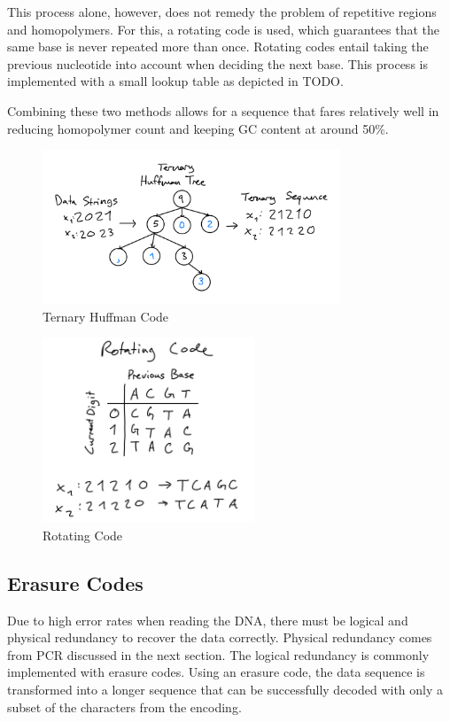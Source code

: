 \documentclass[a4paper,conference]{IEEEtran}
\begin{document}
This process alone, however, does not remedy the problem of repetitive regions and homopolymers. For this, a rotating code is used, which guarantees that the same base is never repeated more than once. Rotating codes entail taking the previous nucleotide into account when deciding the next base. This process is implemented with a small lookup table as depicted in TODO.

Combining these two methods allows for a sequence that fares relatively well in reducing homopolymer count and keeping GC content at around 50\%.



\begin{figure}
\centering
\includegraphics[width=3.5in]{huffman}
\caption{Ternary Huffman Code}
\label{code}
\end{figure}
\begin{figure}
\centering
\includegraphics[width=2.5in]{rotatingcode}
\caption{Rotating Code}
\label{code}
\end{figure}

\subsection{Erasure Codes}
Due to high error rates when reading the DNA, there must be logical and physical redundancy to recover the data correctly. Physical redundancy comes from PCR discussed in the next section. The logical redundancy is commonly \cite{} implemented with erasure codes. Using an erasure code, the data sequence is transformed into a longer sequence that can be successfully decoded with only a subset of the characters from the encoding.
\end{document}
